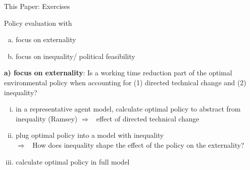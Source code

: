 \documentclass[11pt,aspectratio=169]{beamer}
\newcommand{\ar}{$\Rightarrow$ \ }
\begin{document}
\begin{frame}{This Paper: Exercises}
\begin{block}{Policy evaluation with}
\begin{enumerate}[a)]
	\item focus on externality
	\item focus on inequality/ political feasibility
\end{enumerate}
\end{block} 
\pause
	\textbf{a) focus on externality}: Is a working time reduction part of the optimal environmental policy when accounting for (1) directed technical change and (2) inequality?
	\vspace{0mm}
	\pause
	\begin{enumerate}[(i)]
		\item<+-> in a representative agent model, calculate optimal policy to abstract from inequality (Ramsey)
		\ar effect of directed technical change
		\vspace{2mm}
		\item<+-> plug optimal policy into a model with inequality\\ 
		\ar How does inequality shape the effect of the policy on the externality?
		\vspace{2mm}
		\item<+-> calculate optimal policy in full model %
	\end{enumerate}

\end{frame}

\end{document}
